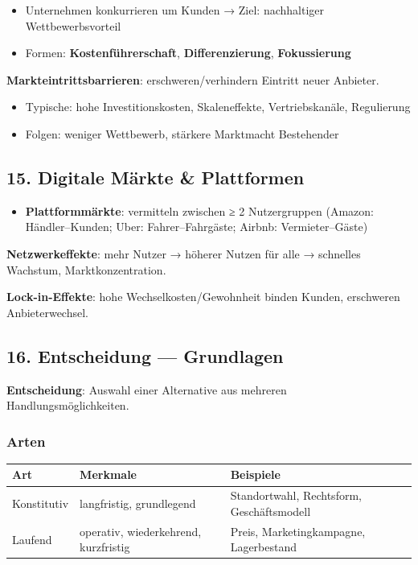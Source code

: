 \documentclass[11pt, a4paper]{article}
\begin{document}
\begin{itemize}
  \item Unternehmen konkurrieren um Kunden → Ziel: nachhaltiger Wettbewerbsvorteil
  \item Formen: \textbf{Kostenführerschaft}, \textbf{Differenzierung}, \textbf{Fokussierung}
\end{itemize}

\textbf{Markteintrittsbarrieren}: erschweren/verhindern Eintritt neuer Anbieter.

\begin{itemize}
  \item Typische: hohe Investitionskosten, Skaleneffekte, Vertriebskanäle, Regulierung
  \item Folgen: weniger Wettbewerb, stärkere Marktmacht Bestehender
\end{itemize}


\subsection{15. Digitale Märkte \& Plattformen}

\begin{itemize}
  \item \textbf{Plattformmärkte}: vermitteln zwischen ≥ 2 Nutzergruppen (Amazon: Händler–Kunden; Uber: Fahrer–Fahrgäste; Airbnb: Vermieter–Gäste)
\end{itemize}

\textbf{Netzwerkeffekte}: mehr Nutzer → höherer Nutzen für alle → schnelles Wachstum, Marktkonzentration.


\textbf{Lock-in-Effekte}: hohe Wechselkosten/Gewohnheit binden Kunden, erschweren Anbieterwechsel.



\subsection{16. Entscheidung — Grundlagen}

\textbf{Entscheidung}: Auswahl einer Alternative aus mehreren Handlungsmöglichkeiten.



\subsubsection{Arten}


{\small
\begin{tabularx}{\linewidth}{XXX}
\hline
\rowcolor{tableheadbg}
{\color{white}\textbf{Art}} & {\color{white}\textbf{Merkmale}} & {\color{white}\textbf{Beispiele}} \\[2pt]
\hline
\endhead
\hline
\endfoot
Konstitutiv & langfristig, grundlegend & Standortwahl, Rechtsform, Geschäftsmodell \\
Laufend & operativ, wiederkehrend, kurzfristig & Preis, Marketingkampagne, Lagerbestand \\
\end{tabularx}
}
\end{document}

